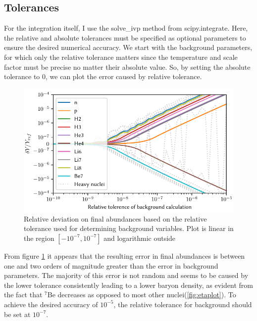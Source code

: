 \subsection{Tolerances}
For the integration itself, I use the solve\_ivp method from scipy.integrate\cite{SciPy}. Here, the relative and absolute tolerances must be specified as optional parameters to ensure the desired numerical accuracy. We start with the background parameters, for which only the relative tolerance matters since the temperature and scale factor must be precise no matter their absolute value. So, by setting the absolute tolerance to 0, we can plot the error caused by relative tolerance.
\begin{figure}[ht]
    \includegraphics[width=5.1in]{figures/rtolbackground.pdf}
    \caption{Relative deviation on final abundances based on the relative tolerance used for determining background variables. Plot is linear in the region $[-10^{-7},10^{-7}]$ and logarithmic outside}
    \label{fig:rtolbackground}
\end{figure}
From figure \ref{fig:rtolbackground} it appears that the resulting error in final abundances is between one and two orders of magnitude greater than the error in background parameters. The majority of this error is not random and seems to be caused by the lower tolerance consistently leading to a lower baryon density, as evident from the fact that ${}^{7}$Be decreases as opposed to most other nuclei(\cref{fig:etaplot}). To achieve the desired accuracy of $10^{-5}$, the relative tolerance for background should be set at $10^{-7}$.

